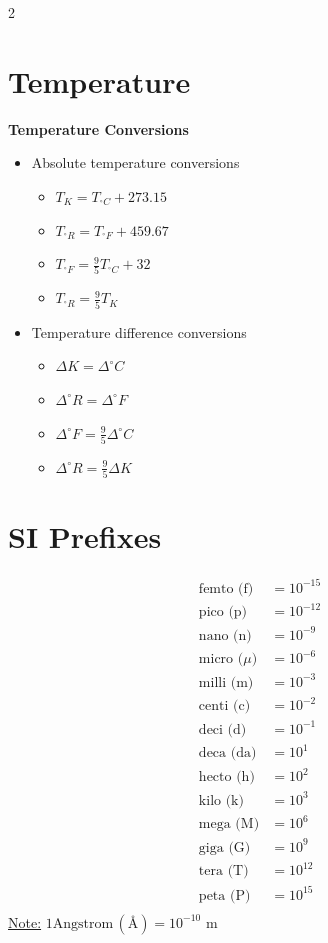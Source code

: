 \documentclass[10pt, fleqn]{article}
\begin{document}
\begin{multicols}{2}
\section*{Temperature}
\textbf{Temperature Conversions}
\begin{itemize}[label=\textbullet]
    \item Absolute temperature conversions
    \begin{itemize}[label=\textopenbullet]
        \item $T_{K} = T_{^\circ C} + 273.15$
        \item $T_{^\circ R} = T_{^\circ F} + 459.67$
        \item $T_{^\circ F} = \frac{9}{5}T_{^\circ C} + 32$
        \item $T_{^\circ R} = \frac{9}{5}T_{K}$
    \end{itemize}
    \item Temperature difference conversions
    \begin{itemize}[label=\textopenbullet]
        \item $\Delta K = \Delta ^\circ C$
        \item $\Delta ^\circ R = \Delta ^\circ F$
        \item $\Delta ^\circ F = \frac{9}{5}\Delta ^\circ C$
        \item $\Delta ^\circ R = \frac{9}{5}\Delta K$
    \end{itemize}
\end{itemize}
\section*{SI Prefixes}
\makeatletter
\@fleqnfalse
\makeatother
\[\begin{aligned}
\text{femto (f)}  &= 10^{-15} \\
\text{pico (p)}   &= 10^{-12} \\
\text{nano (n)}   &= 10^{-9} \\
\text{micro ($\mu$)}  &= 10^{-6} \\
\text{milli (m)}  &= 10^{-3} \\
\text{centi (c)}  &= 10^{-2} \\
\text{deci (d)}   &= 10^{-1} \\
\text{deca (da)}  &= 10^{1} \\
\text{hecto (h)}  &= 10^{2} \\
\text{kilo (k)}   &= 10^{3} \\
\text{mega (M)}   &= 10^{6} \\
\text{giga (G)}   &= 10^{9} \\
\text{tera (T)}   &= 10^{12} \\
\text{peta (P)}   &= 10^{15} \\
\end{aligned}\]
\makeatletter
\@fleqntrue
\makeatother
\underline{Note:} $1\text{Angstrom}\,(\text{\AA}) = 10^{-10}$ m

\end{multicols}
\end{document}
